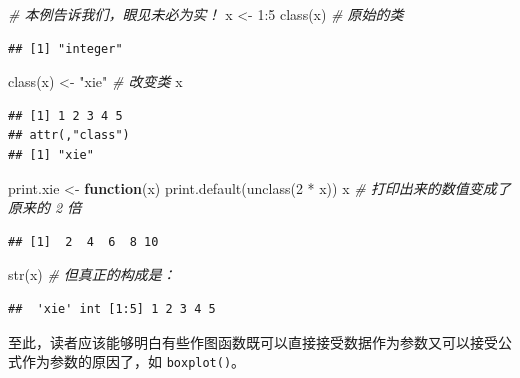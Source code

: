 \documentclass[
  b5paper,
  UTF8,twoside]{book}
\newenvironment{Shaded}{\begin{snugshade}}{\end{snugshade}}
\newcommand{\CommentTok}[1]{\textcolor[rgb]{0.56,0.35,0.01}{\textit{#1}}}
\newcommand{\ControlFlowTok}[1]{\textcolor[rgb]{0.13,0.29,0.53}{\textbf{#1}}}
\newcommand{\DecValTok}[1]{\textcolor[rgb]{0.00,0.00,0.81}{#1}}
\newcommand{\FunctionTok}[1]{\textcolor[rgb]{0.00,0.00,0.00}{#1}}
\newcommand{\NormalTok}[1]{#1}
\newcommand{\OtherTok}[1]{\textcolor[rgb]{0.56,0.35,0.01}{#1}}
\newcommand{\SpecialCharTok}[1]{\textcolor[rgb]{0.00,0.00,0.00}{#1}}
\newcommand{\StringTok}[1]{\textcolor[rgb]{0.31,0.60,0.02}{#1}}
\begin{document}
\begin{Shaded}
\begin{Highlighting}[]
\CommentTok{\# 本例告诉我们，眼见未必为实！}
\NormalTok{x }\OtherTok{\textless{}{-}} \DecValTok{1}\SpecialCharTok{:}\DecValTok{5}
\FunctionTok{class}\NormalTok{(x) }\CommentTok{\# 原始的类}
\end{Highlighting}
\end{Shaded}

\begin{verbatim}
## [1] "integer"
\end{verbatim}

\begin{Shaded}
\begin{Highlighting}[]
\FunctionTok{class}\NormalTok{(x) }\OtherTok{\textless{}{-}} \StringTok{"xie"} \CommentTok{\# 改变类}
\NormalTok{x}
\end{Highlighting}
\end{Shaded}

\begin{verbatim}
## [1] 1 2 3 4 5
## attr(,"class")
## [1] "xie"
\end{verbatim}

\begin{Shaded}
\begin{Highlighting}[]
\NormalTok{print.xie }\OtherTok{\textless{}{-}} \ControlFlowTok{function}\NormalTok{(x) }\FunctionTok{print.default}\NormalTok{(}\FunctionTok{unclass}\NormalTok{(}\DecValTok{2} \SpecialCharTok{*}\NormalTok{ x))}
\NormalTok{x }\CommentTok{\# 打印出来的数值变成了原来的 2 倍}
\end{Highlighting}
\end{Shaded}

\begin{verbatim}
## [1]  2  4  6  8 10
\end{verbatim}

\begin{Shaded}
\begin{Highlighting}[]
\FunctionTok{str}\NormalTok{(x) }\CommentTok{\# 但真正的构成是：}
\end{Highlighting}
\end{Shaded}

\begin{verbatim}
##  'xie' int [1:5] 1 2 3 4 5
\end{verbatim}

至此，读者应该能够明白有些作图函数既可以直接接受数据作为参数又可以接受公式作为参数的原因了，如 \texttt{boxplot()}。
\end{document}

